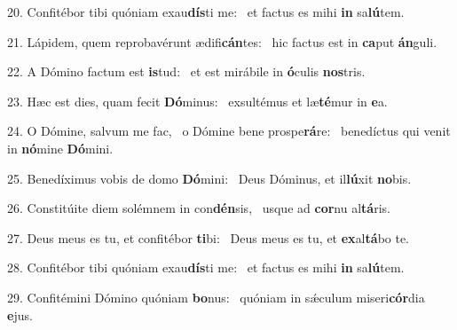 20. Confitébor tibi quóniam exau\textbf{dís}ti me: \ast\  et factus es mihi \textbf{in} sa\textbf{lú}tem.\

21. Lápidem, quem reprobavérunt ædifi\textbf{cán}tes: \ast\  hic factus est in \textbf{ca}put \textbf{án}guli.\

22. A Dómino factum est \textbf{is}tud: \ast\  et est mirábile in \textbf{ó}culis \textbf{nos}tris.\

23. Hæc est dies, quam fecit \textbf{Dó}minus: \ast\  exsultémus et læ\textbf{té}mur in \textbf{e}a.\

24. O Dómine, salvum me fac, \dag\  o Dómine bene prospe\textbf{rá}re: \ast\  benedíctus qui venit in \textbf{nó}mine \textbf{Dó}mini.\

25. Benedíximus vobis de domo \textbf{Dó}mini: \ast\  Deus Dóminus, et il\textbf{lú}xit \textbf{no}bis.\

26. Constitúite diem solémnem in con\textbf{dén}sis, \ast\  usque ad \textbf{cor}nu al\textbf{tá}ris.\

27. Deus meus es tu, et confitébor \textbf{ti}bi: \ast\  Deus meus es tu, et \textbf{ex}al\textbf{tá}bo te.\

28. Confitébor tibi quóniam exau\textbf{dís}ti me: \ast\  et factus es mihi \textbf{in} sa\textbf{lú}tem.\

29. Confitémini Dómino quóniam \textbf{bo}nus: \ast\  quóniam in sǽculum miseri\textbf{cór}dia \textbf{e}jus.\

